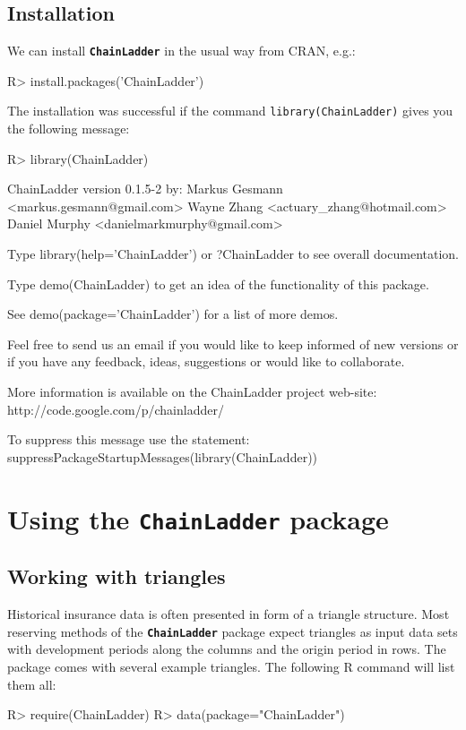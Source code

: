 \documentclass{article}
\newcommand{\chainladder}{\textbf{\texttt{ChainLadder}} }
\begin{document}
\subsection{Installation}
We can install \chainladder in the usual way from CRAN, e.g.:
\begin{Schunk}
\begin{Sinput}
R> install.packages('ChainLadder') 
\end{Sinput}
\end{Schunk}
The installation was successful if the
command \texttt{library(ChainLadder)} gives you the following message:
\begin{Schunk}
\begin{Sinput}
R> library(ChainLadder)
\end{Sinput}
\end{Schunk}
\begin{Schunk}
\begin{Soutput}
ChainLadder version 0.1.5-2 by:
Markus Gesmann <markus.gesmann@gmail.com>
Wayne Zhang <actuary_zhang@hotmail.com>
Daniel Murphy <danielmarkmurphy@gmail.com>

Type library(help='ChainLadder') or ?ChainLadder
to see overall documentation.

Type demo(ChainLadder) to get an idea of the functionality of this package.

See demo(package='ChainLadder') for a list of more demos.

Feel free to send us an email if you would like to keep informed of
new versions or if you have any feedback, ideas, suggestions or would
like to collaborate.

More information is available on the ChainLadder project web-site:
http://code.google.com/p/chainladder/

To suppress this message use the statement:
suppressPackageStartupMessages(library(ChainLadder))
\end{Soutput}
\end{Schunk}

\section{Using the  \chainladder package}

\subsection{Working with triangles}

Historical insurance data is often presented in form of a triangle structure.
Most reserving methods of the \chainladder package expect triangles as 
input data sets with development periods along the columns and the origin 
period in rows. The package comes with several example triangles. 
The following R command will list them all:
\begin{Schunk}
\begin{Sinput}
R> require(ChainLadder)
R> data(package="ChainLadder")
\end{Sinput}
\end{Schunk}
\end{document}
